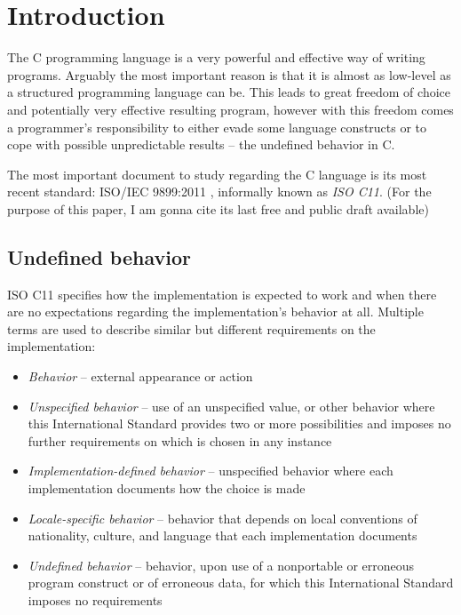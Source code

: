 
\chapter{Introduction}
The C programming language is a very powerful and effective way of writing programs. Arguably the most important reason is that it is almost as low-level as a structured programming language can be. This leads to great freedom of choice and potentially very effective resulting program, however with this freedom comes a programmer's responsibility to either evade some language constructs or to cope with possible unpredictable results -- the undefined behavior in C.

The most important document to study regarding the C language is its most recent standard: ISO/IEC 9899:2011\cite{C11} , informally known as \emph{ISO C11}. (For the purpose of this paper, I am gonna cite its last free and public draft available\cite{WG14N1570})

\section{Undefined behavior}
ISO C11 specifies how the implementation is expected to work and when there are no expectations regarding the implementation's behavior at all. Multiple terms are used to describe similar but different requirements on the implementation:\cite{WG14N1570}
\begin{itemize}
    \item \emph{Behavior} -- external  appearance or action
    \item \emph{Unspecified behavior} -- use of an unspecified value, or other behavior where this International Standard provides two or more possibilities and imposes no further requirements on which is chosen in any instance
    \item \emph{Implementation-defined behavior} -- unspecified behavior where each implementation documents how the choice is made
    \item \emph{Locale-specific behavior} -- behavior that depends on local conventions of nationality, culture, and language that each implementation documents
    \item \emph{Undefined behavior} -- behavior, upon use of a nonportable or erroneous program construct or of erroneous data, for which this International Standard imposes no requirements
\end{itemize}


